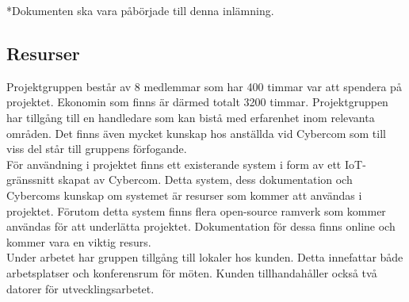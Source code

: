 *Dokumenten ska vara påbörjade till denna inlämning.

\subsection{Resurser}
Projektgruppen består av 8 medlemmar som har 400 timmar var att spendera på projektet. Ekonomin som finns är därmed totalt 3200 timmar. Projektgruppen har tillgång till en handledare som kan bistå med erfarenhet inom relevanta områden. Det finns även mycket kunskap hos anställda vid Cybercom som till viss del står till gruppens förfogande.\\

För användning i projektet finns ett existerande system i form av ett IoT-gränssnitt skapat av Cybercom. Detta system,
dess dokumentation och Cybercoms kunskap om systemet är resurser som kommer att användas i projektet. Förutom detta
system finns flera open-source ramverk som kommer användas för att underlätta projektet. Dokumentation för dessa finns online och kommer vara en viktig resurs.\\

Under arbetet har gruppen tillgång till lokaler hos kunden. Detta innefattar både arbetsplatser och konferensrum för möten. Kunden tillhandahåller också två datorer för utvecklingsarbetet. \\

\pagebreak
